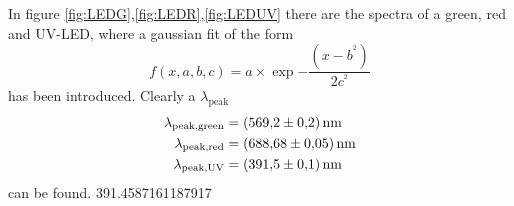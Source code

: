 In figure \ref{fig:LEDG},\ref{fig:LEDR},\ref{fig:LEDUV} there are the spectra of a green, red and UV-LED, where a gaussian fit of the form 
\begin{equation}
    f(x,a,b,c) = a \times \exp{-\frac{(x-b^^2)}{2 c^^2}}
\end{equation}
has been introduced. Clearly a $\lambda_\text{peak}$ 
\begin{align*}
    \lambda_\text{peak,green} &= \SI{569.2 \pm 0.2}{\nano\meter} \\
    \lambda_\text{peak,red} &= \SI{688.68 \pm 0.05}{\nano\meter} \\
    \lambda_\text{peak,UV} &= \SI{391.5 \pm 0.1}{\nano\meter} \\
\end{align*}
can be found.
391.4587161187917 